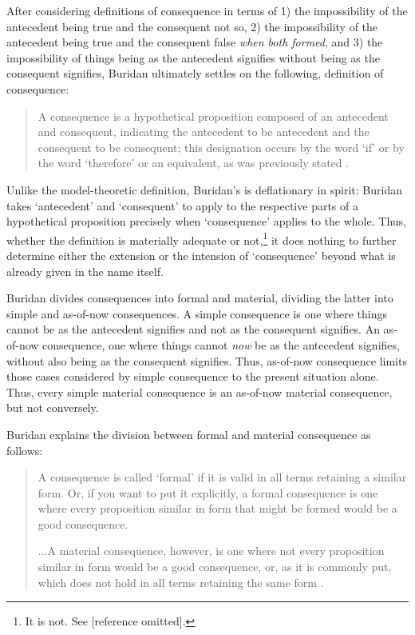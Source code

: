 \documentclass[]{article}
\begin{document}
After considering definitions of consequence in terms of 1) the impossibility of the antecedent being true and the consequent not so, 2) the impossibility of the antecedent being true and the consequent false \textit{when both formed}, and 3) the impossibility of things being as the antecedent signifies without being as the consequent signifies, Buridan ultimately settles on the following, definition of consequence: 

\begin{quote}
A consequence is a hypothetical proposition composed of an antecedent and consequent, indicating the antecedent to be antecedent and the consequent to be consequent; this designation occurs by the word `if' or by the word `therefore' or an equivalent, as was previously stated \cite[TC I. 3, 67]{Buridan2015}.
\end{quote}

Unlike the model-theoretic definition, Buridan's is deflationary in spirit: Buridan takes `antecedent' and `consequent' to apply to the respective parts of a hypothetical proposition precisely when `consequence' applies to the whole. Thus, whether the definition is materially adequate or not,\footnote{It is not. See [reference omitted].} it does nothing to further determine either the extension or the intension of `consequence' beyond what is already given in the name itself.

Buridan divides consequences into formal and material, dividing the latter into simple and as-of-now consequences. A simple consequence is one where things cannot be as the antecedent signifies and not as the consequent signifies. An as-of-now consequence, one where things cannot \textit{now} be as the antecedent signifies, without also being as the consequent signifies. Thus, as-of-now consequence limits those cases considered by simple consequence to the present situation alone. Thus, every simple material consequence is an as-of-now material consequence, but not conversely. 

Buridan explains the division between formal and material consequence as follows: 
\begin{quote}
A consequence is called `formal' if it is valid in all terms retaining a similar form. Or, if you want to put it explicitly, a formal consequence is one where every proposition similar in form that might be formed would be a good consequence.

...A material consequence, however, is one where not every proposition similar in form would be a good consequence, or, as it is commonly put, which does not hold in all terms retaining the same form \cite[TC I. 4, 68]{Buridan2015}.
\end{quote}
\end{document}
